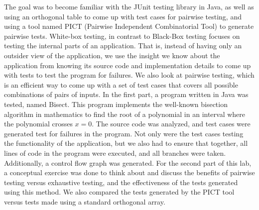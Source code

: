 The goal was to become familiar with the JUnit testing library in Java, as well
as using an orthogonal table to come up with test cases for pairwise testing,
and using a tool named PICT (Pairwise Independent Combinatorial Tool) to
generate pairwise tests. White-box testing, in contrast to Black-Box testing
focuses on testing the internal parts of an application. That is, instead of
having only an outsider view of the application, we use the insight we know
about the application from knowing its source code and implementation details
to come up with tests to test the program for failures. We also look at
pairwise testing, which is an efficient way to come up with a set of test cases
that covers all possible combinations of pairs of inputs.  In the first part, a
program written in Java was tested, named Bisect.  This program implements the
well-known bisection algorithm in mathematics to find the root of a polynomial
in an interval where the polynomial crosses $x=0$. The source code was
analyzed, and test cases were generated test for failures in the program. Not
only were the test cases testing the functionality of the application, but we
also had to ensure that together, all lines of code in the program were
executed, and all branches were taken. Additionally, a control flow graph was
generated. For the second part of this lab, a conceptual exercise was done to
think about and discuss the benefits of pairwise testing versus exhaustive
testing, and the effectiveness of the tests generated using this method. We
also compared the tests generated by the PICT tool versus tests made using a
standard orthogonal array.

